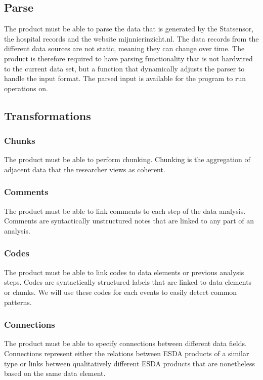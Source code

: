 \documentclass[11pt,twoside,a4paper]{article}
\begin{document}
\subsection{Parse}
The product must be able to parse the data that is generated by the Statsensor, the hospital records and the website mijnnierinzicht.nl. The data records from the different data sources are not static, meaning they can change over time. The product is therefore required to have parsing functionality that is not hardwired to the current data set, but a function that dynamically adjusts the parser to handle the input format. The parsed input is available for the program to run operations on.

\subsection{Transformations}
\subsubsection{Chunks}
The product must be able to perform chunking. Chunking is the aggregation of adjacent data that the researcher views as coherent. 

\subsubsection{Comments}
The product must be able to link comments to each step of the data analysis. Comments are syntactically unstructured notes that are linked to any part of an analysis.

\subsubsection{Codes}
The product must be able to link codes to data elements or previous analysis steps. Codes are syntactically structured labels that are linked to data elements or chunks. We will use these codes for each events to easily detect common patterns.

\subsubsection{Connections}
The product must be able to specify connections between different data fields. Connections represent either the relations between ESDA products of a similar type or links between qualitatively different ESDA products that are nonetheless based on the same data element.
\end{document}
